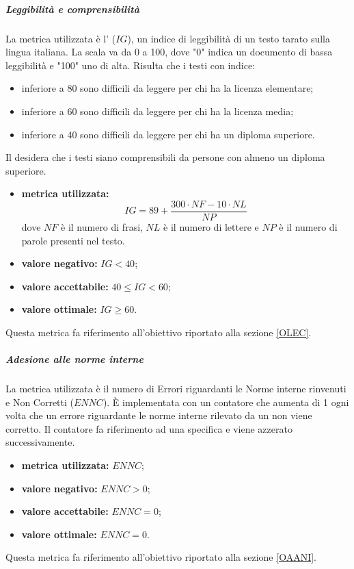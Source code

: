 			
				\subparagraph{Leggibilità e comprensibilità}
				\label{MLEC}
				La metrica utilizzata è l' ($IG$), un indice di leggibilità di un testo tarato sulla lingua italiana. La scala va da 0 a 100, dove "0" indica un documento di bassa leggibilità e "100" uno di alta. Risulta che i testi con indice:
				\begin{itemize}
					\item inferiore a 80 sono difficili da leggere per chi ha la licenza elementare;
					\item inferiore a 60 sono difficili da leggere per chi ha la licenza media;
					\item inferiore a 40 sono difficili da leggere per chi ha un diploma superiore.
				\end{itemize}
				Il  desidera che i testi siano comprensibili da persone con almeno un diploma superiore.
				\begin{itemize}
					\item \textbf{metrica utilizzata:} $$IG=89 + \frac{300\cdot{}NF-10\cdot{}NL}{NP}$$
					dove $NF$ è il numero di frasi, $NL$ è il numero di lettere e $NP$ è il numero di parole presenti nel testo.
					\item \textbf{valore negativo:} $IG<40$;
					\item \textbf{valore accettabile:} $40\leq IG <60$;
					\item \textbf{valore ottimale:} $IG\geq 60$.
				\end{itemize}
				Questa metrica fa riferimento all'obiettivo riportato alla sezione \ref{OLEC}.
				
				\subparagraph{Adesione alle norme interne}
				\label{MAANI}
				La metrica utilizzata è il numero di Errori riguardanti le Norme interne rinvenuti e Non Corretti ($ENNC$). È implementata con un contatore che aumenta di 1 ogni volta che un errore riguardante le norme interne rilevato da un \verificatore{} non viene corretto. Il contatore fa riferimento ad una specifica  e viene azzerato successivamente.
				\begin{itemize}
					\item \textbf{metrica utilizzata:} $ENNC$;
					\item \textbf{valore negativo:} $ENNC>0$;
					\item \textbf{valore accettabile:} $ENNC=0$;
					\item \textbf{valore ottimale:} $ENNC=0$.
				\end{itemize}
				Questa metrica fa riferimento all'obiettivo riportato alla sezione \ref{OAANI}.
				

